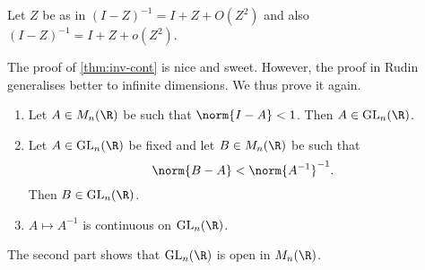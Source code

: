 
\begin{exercise}
    Let $Z$ be as in 
    $(I - Z)^{-1} = I + Z + O(Z^2)$ and also
    $(I - Z)^{-1} = I + Z + o(Z^2)$.
\end{exercise}

The proof of \cref{thm:inv-cont} is nice and sweet.
However, the proof in Rudin generalises better to infinite dimensions.
We thus prove it again.
\begin{proposition*} \label{thm:inv-cont-rudin} \leavevmode
    \begin{enumerate}
        \item Let $A \in M_n(\R)$ be such that $\norm{I - A} < 1$.
        Then $A \in \GL_n(\R)$.
        \item Let $A \in \GL_n(\R)$ be fixed and let
        $B \in M_n(\R)$ be such that \[
            \norm{B - A} < \norm{A^{-1}}^{-1}.
        \] Then $B \in \GL_n(\R)$.
        \item $A \mapsto A^{-1}$ is continuous on $\GL_n(\R)$.
    \end{enumerate}
\end{proposition*}
\begin{remark}
    The second part shows that $\GL_n(\R)$ is open in $M_n(\R)$.
\end{remark}
